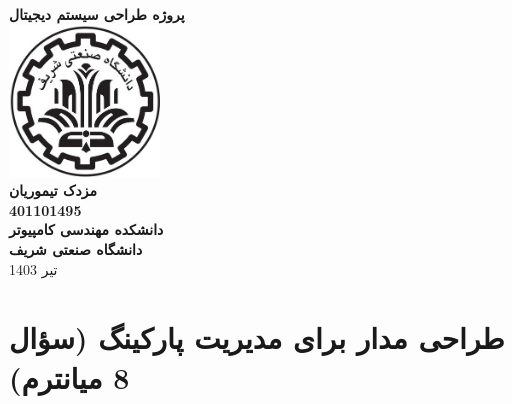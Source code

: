 \documentclass{article}
\begin{document}
\begin{titlepage}
    \begin{center}
        \textbf{\Huge{پروژه طراحی سیستم دیجیتال}}\\
        \vspace{1cm}
        \includegraphics[width=0.3\textwidth]{sharif.jpg}\\
        \vspace{1cm}
        \textbf{ \Large{مزدک تیموریان}}\\
        \vspace{0.4cm}
        \textbf{ \large{401101495}}\\
        \vspace{1cm}
        \textbf{ \Large{دانشکده مهندسی کامپیوتر}}\\
        \vspace{0.4cm}
        \textbf{ \Large{دانشگاه صنعتی شریف}}\\
        \vspace{0.6cm}
        \large{تیر 1403}
    \end{center}
    \thispagestyle{empty}
\end{titlepage}

\section*{طراحی مدار برای مدیریت پارکینگ
(سؤال 8 میانترم)}
\end{document}
